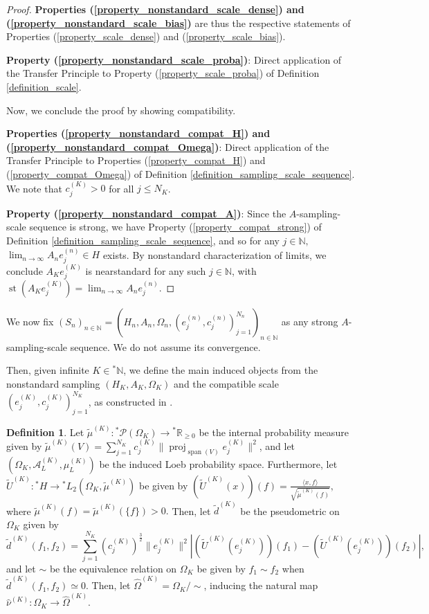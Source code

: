 \documentclass{amsart}
\theoremstyle{definition}
\newtheorem{defn}[thm]{Definition}
\theoremstyle{remark}
\def \Proj{\operatorname{proj}}
\def \Span{\operatorname{span}}
\def \St{\operatorname{st}}
\def \HOM{\hat{\Omega}}
\def \HNU{\hat{\nu}}
\def \LL{\langle}
\def \RR{\rangle}
\begin{document}
\begin{proof}
	\textbf{Properties (\ref{property_nonstandard_scale_dense}) and (\ref{property_nonstandard_scale_bias})} are thus the respective statements of Properties (\ref{property_scale_dense}) and (\ref{property_scale_bias}).
	
	\textbf{Property (\ref{property_nonstandard_scale_proba})}: Direct application of the Transfer Principle to Property (\ref{property_scale_proba}) of Definition \ref{definition_scale}.
	
	Now, we conclude the proof by showing compatibility.
	
	\textbf{Properties (\ref{property_nonstandard_compat_H}) and (\ref{property_nonstandard_compat_Omega})}: Direct application of the Transfer Principle to Properties (\ref{property_compat_H}) and (\ref{property_compat_Omega}) of Definition \ref{definition_sampling_scale_sequence}. We note that $c_j^{(K)}>0$ for all $j\leq N_K$.
	
	\textbf{Property (\ref{property_nonstandard_compat_A})}: Since the $A$-sampling-scale sequence is strong, we have Property (\ref{property_compat_strong}) of Definition \ref{definition_sampling_scale_sequence}, and so for any $j\in\mathbb{N},$ $\lim_{n\rightarrow\infty}A_n e_j^{(n)}\in H$ exists. By nonstandard characterization of limits, we conclude $A_Ke_j^{(K)}$ is nearstandard for any such $j\in\mathbb{N}$, with $\St\left(A_K e_j^{(K)}\right)=\lim_{n\rightarrow\infty}A_n e_j^{(n)} $.
\end{proof}

We now fix $(S_n)_{n\in\mathbb{N}}=(H_n,A_n,\Omega_n, (e_j^{(n)},c_j^{(n)})_{j=1}^{N_n})_{n\in\mathbb{N}}$ as any strong $A$-sampling-scale sequence. We do not assume its convergence. 

Then, given infinite $K\in{}^*\mathbb{N}$, we define the main induced objects from the nonstandard sampling $(H_K,A_K,\Omega_K)$ and the compatible scale $(e_j^{(K)}, c_j^{(K)})_{j=1}^{N_K}$, as constructed in \cite{nonez2024spectralequivalencesnonstandardsamplings}.

\begin{defn}\label{definition_nonstandard_internal_measure}
	Let $\tilde{\mu}^{(K)}:{}^*\mathcal{P}(\Omega_K)\rightarrow{}^*\mathbb{R}_{\geq0}$ be the internal probability measure given by $\tilde{\mu}^{(K)}(V)=\sum_{j=1}^{N_K}c_j^{(K)}\|\Proj_{\Span(V)}e_j^{(K)}\|^2$, and let $(\Omega_K,\mathcal{A}_L^{(K)},\mu_L^{(K)})$ be the induced Loeb probability space. Furthermore, let $\tilde{U}^{(K)}:{}^*H\rightarrow {}^*L_2(\Omega_K,\tilde{\mu}^{(K)})$ be given by $\left(\tilde{U}^{(K)}(x)\right)(f)=\frac{\LL x, f\RR}{\sqrt{\tilde{\mu}^{(K)}(f)}},$ where $\tilde{\mu}^{(K)}(f)=\tilde{\mu}^{(K)}(\{f\})>0.$ Then, let $\tilde{d}^{(K)}$ be the pseudometric on $\Omega_K$ given by $$\tilde{d}^{(K)}(f_1, f_2)=\sum_{j=1}^{N_K}\left(c_j^{(K)}\right)^{\frac{3}{2}}\|e_j^{(K)}\|^2\left|\left(\tilde{U}^{(K)}(e_j^{(K)})\right)(f_1)-\left(\tilde{U}^{(K)}(e_j^{(K)})\right)(f_2)\right|,$$ and let $\sim$ be the equivalence relation on $\Omega_K$ be given by $f_1\sim f_2$ when $\tilde{d}^{(K)}(f_1,f_2)\simeq 0.$ Then, let $\HOM^{(K)}=\Omega_K/\sim$, inducing the natural map $\HNU^{(K)}:\Omega_K\rightarrow\HOM^{(K)}.$
\end{defn}
\end{document}
